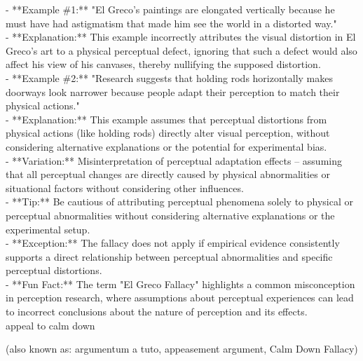 \documentclass[a4paper,12pt,single,pdftex]{scrbook}
\begin{document}
    
      - **Example \#1:** "El Greco's paintings are elongated vertically because he must have had astigmatism that made him see the world in a distorted way."
    \\

    
      - **Explanation:** This example incorrectly attributes the visual distortion in El Greco's art to a physical perceptual defect, ignoring that such a defect would also affect his view of his canvases, thereby nullifying the supposed distortion.
    \\

    
      - **Example \#2:** "Research suggests that holding rods horizontally makes doorways look narrower because people adapt their perception to match their physical actions."
    \\

    
      - **Explanation:** This example assumes that perceptual distortions from physical actions (like holding rods) directly alter visual perception, without considering alternative explanations or the potential for experimental bias.
    \\

    
      - **Variation:** Misinterpretation of perceptual adaptation effects – assuming that all perceptual changes are directly caused by physical abnormalities or situational factors without considering other influences.
    \\

    
      - **Tip:** Be cautious of attributing perceptual phenomena solely to physical or perceptual abnormalities without considering alternative explanations or the experimental setup.
    \\

    
      - **Exception:** The fallacy does not apply if empirical evidence consistently supports a direct relationship between perceptual abnormalities and specific perceptual distortions.
    \\

    
      - **Fun Fact:** The term "El Greco Fallacy" highlights a common misconception in perception research, where assumptions about perceptual experiences can lead to incorrect conclusions about the nature of perception and its effects.
    \\

  

appeal to calm down
    
      (also known as: argumentum a tuto, appeasement argument, Calm Down Fallacy)
    \\
\end{document}
